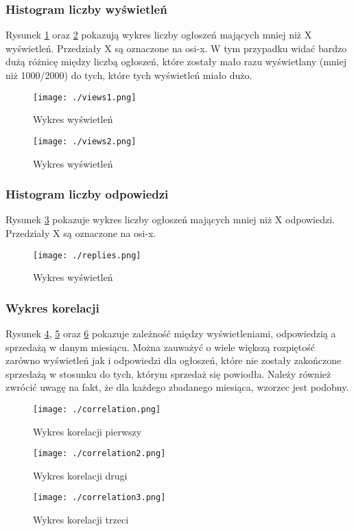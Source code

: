 \documentclass[a4paper,11pt]{article}
\begin{document}
\subsubsection{Histogram liczby wyświetleń} 
Rysunek \ref{fig:wyswietlenia1} oraz \ref{fig:wyswietlenia2} pokazują wykres liczby ogłoszeń mających mniej niż X wyświetleń. Przedziały X są oznaczone na osi-x. W tym przypadku widać bardzo dużą różnicę między liczbą ogłoszeń, które zostały mało razu wyświetlany (mniej niż 1000/2000) do tych, które tych wyświetleń miało dużo.

\begin{figure}[H]
	\centering
	\texttt{[image: ./views1.png]}
	\caption{\label{fig:wyswietlenia1}Wykres wyświetleń}
\end{figure}
\begin{figure}[H]
	\centering
	\texttt{[image: ./views2.png]}
	\caption{\label{fig:wyswietlenia2}Wykres wyświetleń}
\end{figure}
\subsubsection{Histogram liczby odpowiedzi} 
Rysunek \ref{fig:odpowiedzi1} pokazuje wykres liczby ogłoszeń mających mniej niż X odpowiedzi. Przedziały X są oznaczone na osi-x.

\begin{figure}[H]
	\centering
	\texttt{[image: ./replies.png]}
	\caption{\label{fig:odpowiedzi1}Wykres wyświetleń}
\end{figure}

\subsubsection{Wykres korelacji} 
Rysunek \ref{fig:korelacja}, \ref{fig:korelacja2} oraz \ref{fig:korelacja3} pokazuje zależność między wyświetleniami, odpowiedzią a sprzedażą w danym miesiącu. Można zauważyć o wiele większą rozpiętość zarówno wyświetleń jak i odpowiedzi dla ogłoszeń, które nie zostały zakończone sprzedażą w stosunku do tych, którym sprzedaż się powiodła. Należy również zwrócić uwagę na fakt, że dla każdego zbadanego miesiąca, wzorzec jest podobny.
 
\begin{figure}[H]
	\centering
	\texttt{[image: ./correlation.png]}
	\caption{\label{fig:korelacja}Wykres korelacji pierwszy}
\end{figure}

\begin{figure}[H]
	\centering
	\texttt{[image: ./correlation2.png]}
	\caption{\label{fig:korelacja2}Wykres korelacji drugi}
\end{figure}
\begin{figure}[H]
	\centering
	\texttt{[image: ./correlation3.png]}
	\caption{\label{fig:korelacja3}Wykres korelacji trzeci}
\end{figure}
\end{document}
